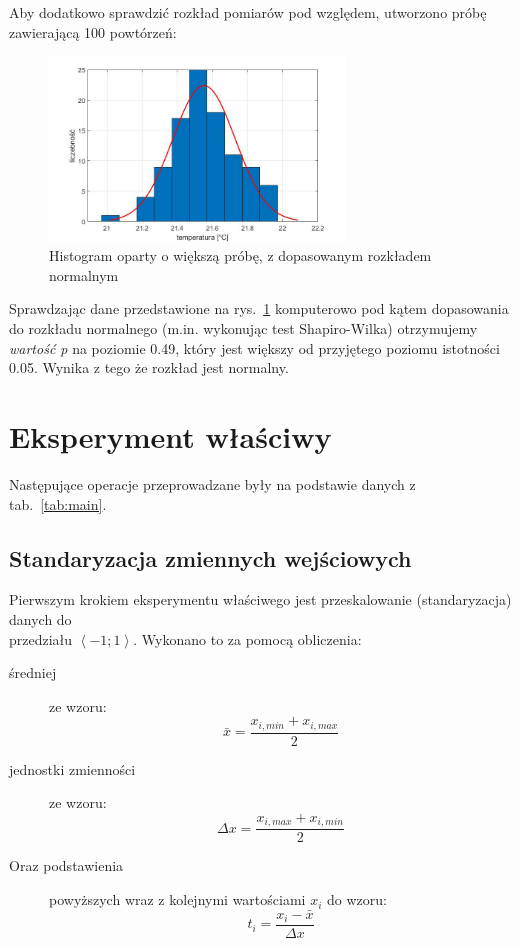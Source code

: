 \documentclass[a4paper, 12pt]{mwart}
\begin{document}
			Aby dodatkowo sprawdzić rozkład pomiarów pod względem, utworzono próbę zawierającą 
			100 powtórzeń:

			\begin{figure}[h]
				\begin{center}
					\includegraphics[width = 0.7\textwidth]{graphs/histfit.jpg}
					\caption{Histogram oparty o większą próbę, z dopasowanym rozkładem normalnym}
					\label{fig:histfit}
				\end{center}
			\end{figure}

			Sprawdzając dane przedstawione na rys.~\ref{fig:histfit} komputerowo pod kątem dopasowania 
			do rozkładu normalnego (m.in. wykonując test Shapiro-Wilka) otrzymujemy \emph{wartość p} na 
			poziomie 0.49, który jest większy od przyjętego poziomu istotności 0.05. Wynika z tego że 
			rozkład jest normalny.

	\newpage
	\section{Eksperyment właściwy}
		Następujące operacje przeprowadzane były na podstawie danych z tab.~\ref{tab:main}.

		\subsection{Standaryzacja zmiennych wejściowych}
			Pierwszym krokiem eksperymentu właściwego jest przeskalowanie (standaryzacja)
			danych do\\ przedziału $\left\langle -1; 1 \right\rangle$. Wykonano to za pomocą obliczenia:
			\begin{description}
				\item[średniej] ze wzoru:
					$$\bar{x} = \frac{x_{i,min} + x_{i,max}}{2}$$
				\item[jednostki zmienności] ze wzoru:
					$$\Delta x = \frac{x_{i,max} + x_{i,min}}{2}$$
				\item[Oraz podstawienia] powyższych wraz z kolejnymi wartościami $x_i$ do wzoru:
					$$t_i = \frac{x_i - \bar{x}}{\Delta x}$$
			\end{description}
\end{document}
